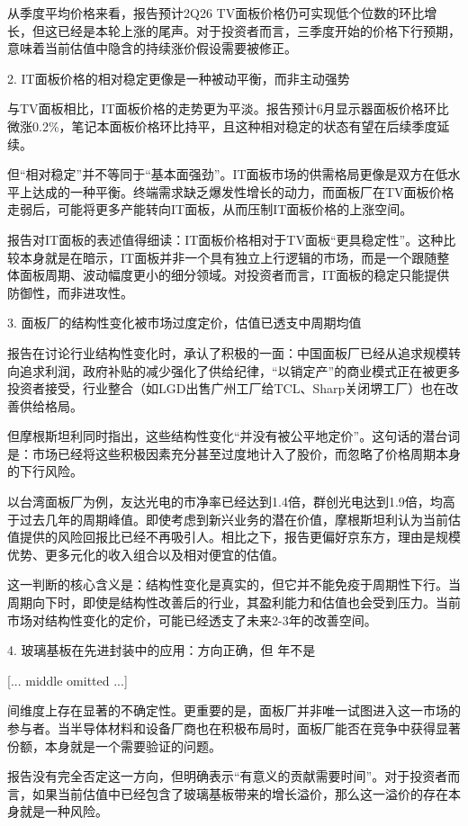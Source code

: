 \documentclass[11pt]{ctexart}
\begin{document}
从季度平均价格来看，报告预计2Q26 TV面板价格仍可实现低个位数的环比增长，但这已经是本轮上涨的尾声。对于投资者而言，三季度开始的价格下行预期，意味着当前估值中隐含的持续涨价假设需要被修正。

2. IT面板价格的相对稳定更像是一种被动平衡，而非主动强势

与TV面板相比，IT面板价格的走势更为平淡。报告预计6月显示器面板价格环比微涨0.2\%，笔记本面板价格环比持平，且这种相对稳定的状态有望在后续季度延续。

但“相对稳定”并不等同于“基本面强劲”。IT面板市场的供需格局更像是双方在低水平上达成的一种平衡。终端需求缺乏爆发性增长的动力，而面板厂在TV面板价格走弱后，可能将更多产能转向IT面板，从而压制IT面板价格的上涨空间。

报告对IT面板的表述值得细读：IT面板价格相对于TV面板“更具稳定性”。这种比较本身就是在暗示，IT面板并非一个具有独立上行逻辑的市场，而是一个跟随整体面板周期、波动幅度更小的细分领域。对投资者而言，IT面板的稳定只能提供防御性，而非进攻性。

3. 面板厂的结构性变化被市场过度定价，估值已透支中周期均值

报告在讨论行业结构性变化时，承认了积极的一面：中国面板厂已经从追求规模转向追求利润，政府补贴的减少强化了供给纪律，“以销定产”的商业模式正在被更多投资者接受，行业整合（如LGD出售广州工厂给TCL、Sharp关闭堺工厂）也在改善供给格局。

但摩根斯坦利同时指出，这些结构性变化“并没有被公平地定价”。这句话的潜台词是：市场已经将这些积极因素充分甚至过度地计入了股价，而忽略了价格周期本身的下行风险。

以台湾面板厂为例，友达光电的市净率已经达到1.4倍，群创光电达到1.9倍，均高于过去几年的周期峰值。即使考虑到新兴业务的潜在价值，摩根斯坦利认为当前估值提供的风险回报比已经不再吸引人。相比之下，报告更偏好京东方，理由是规模优势、更多元化的收入组合以及相对便宜的估值。

这一判断的核心含义是：结构性变化是真实的，但它并不能免疫于周期性下行。当周期向下时，即使是结构性改善后的行业，其盈利能力和估值也会受到压力。当前市场对结构性变化的定价，可能已经透支了未来2-3年的改善空间。

4. 玻璃基板在先进封装中的应用：方向正确，但 年不是

[... middle omitted ...]

间维度上存在显著的不确定性。更重要的是，面板厂并非唯一试图进入这一市场的参与者。当半导体材料和设备厂商也在积极布局时，面板厂能否在竞争中获得显著份额，本身就是一个需要验证的问题。

报告没有完全否定这一方向，但明确表示“有意义的贡献需要时间”。对于投资者而言，如果当前估值中已经包含了玻璃基板带来的增长溢价，那么这一溢价的存在本身就是一种风险。
\end{document}
